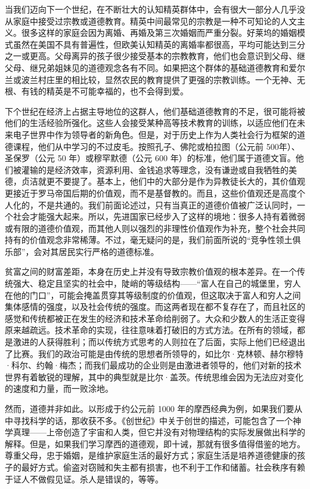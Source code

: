 当我们迈向下一个世纪，在不断壮大的认知精英群体中，会有很大一部分人几乎没从家庭中接受过宗教或道德教育。精英中间最常见的宗教是一种不可知论的人文主义。很多这样的家庭会因为离婚、再婚及第三次婚姻而严重分裂。好莱坞的婚姻模式虽然在美国不具有普遍性，但欧美认知精英的离婚率都很高，平均可能达到三分之一或更高。父母离异的孩子很少接受基本的宗教教育，他们也会意识到父母、继父母、继兄弟姐妹见的道德观念各有不同。如果把这个群体的基础道德教育和爱尔兰或波兰村庄里的相比较，显然农民的教育提供了更强的宗教训练。一个无神、无根、有钱的精英是不可能幸福的，也不会得到爱。

下个世纪在经济上占据主导地位的这群人，他们基础道德教育的不足，很可能将被他们的生活经验所强化。这些人会接受某种高等技术教育的训练，以适应他们在未来电子世界中作为领导者的新角色。但是，对于历史上作为人类社会行为框架的道德课程，他们从中学习的不过皮毛。按照孔子、佛陀或柏拉图（公元前 500年）、圣保罗（公元 50 年）或穆罕默德（公元 600 年）的标准，他们属于道德文盲。他们被灌输的是经济效率，资源利用、金钱追求等理念，没有谦逊或自我牺牲的美德，贞洁就更不要提了。基本上，他们中的大部分是作为异教徒长大的，其价值观更接近于罗马帝国后期的价值观，而不是基督教的。而且，这些价值观还是高度个人化的，不是共通的。我们前面论述过，只有当真正的道德价值被广泛认同时，一个社会才能强大起来。所以，先进国家已经步入了这样的境地：很多人持有着微弱或有限的道德价值观，而其他人则以强烈的非理性价值观作为补充，整个社会共同持有的价值观念非常稀薄。不过，毫无疑问的是，我们前面所说的“竞争性领土俱乐部”，会对其居民实行严格的道德标准。

贫富之间的财富差距，本身在历史上并没有导致宗教价值观的根本差异。在一个传统强大、稳定且坚实的社会中，陡峭的等级结构——“富人在自己的城堡里，穷人在他的门口”，可能会掩盖贯穿其等级制度的价值观，但这取决于富人和穷人之间集体感情的强度，以及社会传统的强度。而这两者现在都不复存在了，而且社区的感觉和传统都被正在发生的经济和技术革命给削弱了。大众和少数人的生活正变得原来越疏远。技术革命的实现，往往意味着打破旧的方式方法。在所有的领域，都是激进的人获得胜利；而以传统方式思考的人则拉在了后面，实际上他们已经退出了比赛。我们的政治可能是由传统的思想者所领导的，如比尔·克林顿、赫尔穆特·科尔、约翰·梅杰；而我们最成功的企业则是由激进者领导的，他们对新的技术世界有着敏锐的理解，其中的典型就是比尔·盖茨。传统思维会因为无法应对变化的速度和力量，而一败涂地。

然而，道德并非如此。以形成于约公元前 1000 年的摩西经典为例，如果我们要从中寻找科学的话，那收获不多。《创世纪》中关于创世的描述，可能包含了一个神学真理——上帝创造了宇宙和人类，但它并没有对物理结构的实际发展做出科学的解释。但是，如果我们学习摩西的道德观，即十诫，那就有很多值得借鉴的地方。尊重父母，忠于婚姻，是维护家庭生活的最好方式；家庭生活是培养道德健康的孩子的最好方式。偷盗对窃贼和失主都有损害，也不利于工作和储蓄。社会秩序有赖于证人不做假见证。杀人是错误的，等等。

